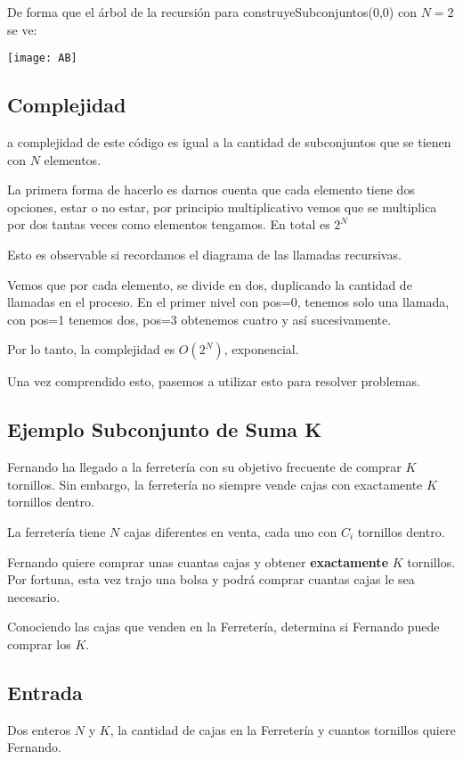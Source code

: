 De forma que el árbol de la recursión para construyeSubconjuntos(0,0) con \(N=2\) se ve:

\begin{center}
	\texttt{[image: AB]}
\end{center} 

\subsection{Complejidad}

a complejidad de este código es igual a la cantidad de subconjuntos que se tienen con \(N\) elementos.

La primera forma de hacerlo es darnos cuenta que cada elemento tiene dos opciones, estar o no estar, por principio multiplicativo vemos que se multiplica por dos tantas veces como elementos tengamos. En total es \(2^N\) 

Esto es observable si recordamos el diagrama de las llamadas recursivas.

Vemos que por cada elemento, se divide en dos, duplicando la cantidad de llamadas en el proceso. En el primer nivel con pos=0, tenemos solo una llamada, con pos=1 tenemos dos, pos=3 obtenemos cuatro y así sucesivamente.

Por lo tanto, la complejidad es \(O(2^N)\), exponencial.

Una vez comprendido esto, pasemos a utilizar esto para resolver problemas.

\subsection*{Ejemplo Subconjunto de Suma K}
Fernando ha llegado a la ferretería con su objetivo frecuente de comprar \(K\) tornillos.  Sin embargo, la ferretería no siempre vende cajas con exactamente \(K\) tornillos dentro.

La ferretería tiene \(N\) cajas diferentes en venta, cada uno con \(C_i\) tornillos dentro.

Fernando quiere comprar unas cuantas cajas y obtener \textbf{exactamente} \(K\) tornillos. Por fortuna, esta vez trajo una bolsa y podrá comprar cuantas cajas le sea necesario.

Conociendo las cajas que venden en la Ferretería, determina si Fernando puede comprar los \(K\).

\subsection*{Entrada}
Dos enteros \(N\) y \(K\), la cantidad de cajas en la Ferretería y cuantos tornillos quiere Fernando.

